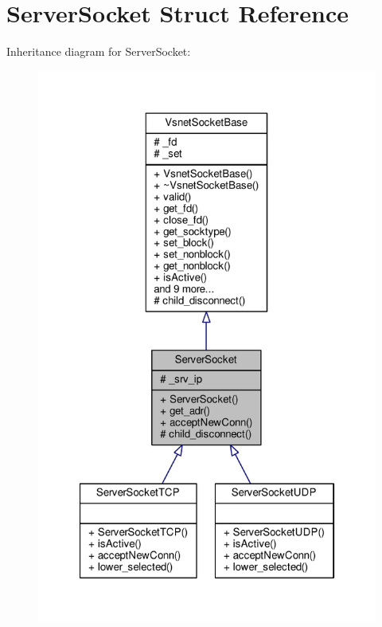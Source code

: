 \hypertarget{structServerSocket}{}\section{Server\+Socket Struct Reference}
\label{structServerSocket}


Inheritance diagram for Server\+Socket\+:
\nopagebreak
\begin{figure}[H]
\begin{center}
\leavevmode
\includegraphics[width=322pt]{d2/df2/structServerSocket__inherit__graph}
\end{center}
\end{figure}



